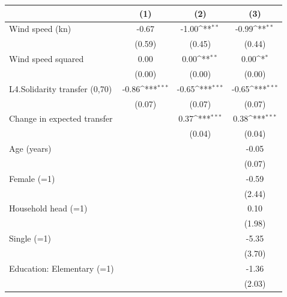 {
\def\sym#1{\ifmmode^{#1}\else\(^{#1}\)\fi}
\begin{tabular}{l*{3}{c}}
\toprule
                    &\multicolumn{1}{c}{(1)}         &\multicolumn{1}{c}{(2)}         &\multicolumn{1}{c}{(3)}         \\
\midrule
Wind speed (kn)     &       -0.67         &       -1.00\sym{**} &       -0.99\sym{**} \\
                    &      (0.59)         &      (0.45)         &      (0.44)         \\
Wind speed squared  &        0.00         &        0.00\sym{**} &        0.00\sym{*}  \\
                    &      (0.00)         &      (0.00)         &      (0.00)         \\
L4.Solidarity transfer (0,70)&       -0.86\sym{***}&       -0.65\sym{***}&       -0.65\sym{***}\\
                    &      (0.07)         &      (0.07)         &      (0.07)         \\
Change in expected transfer&                     &        0.37\sym{***}&        0.38\sym{***}\\
                    &                     &      (0.04)         &      (0.04)         \\
Age (years)         &                     &                     &       -0.05         \\
                    &                     &                     &      (0.07)         \\
Female (=1)         &                     &                     &       -0.59         \\
                    &                     &                     &      (2.44)         \\
Household head (=1) &                     &                     &        0.10         \\
                    &                     &                     &      (1.98)         \\
Single (=1)         &                     &                     &       -5.35         \\
                    &                     &                     &      (3.70)         \\
Education: Elementary (=1)&                     &                     &       -1.36         \\
                    &                     &                     &      (2.03)         \\

\end{tabular}}
